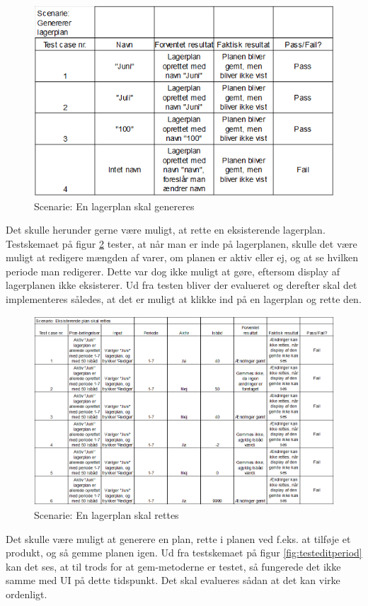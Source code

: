 \begin{figure}[p]
    \centering
    \includegraphics[width=0.7\hsize]{figures/tests/test_generer_plan.png}
    \caption{Scenarie: En lagerplan skal genereres}
    \label{fig:testgenerate}
\end{figure}

Det skulle herunder gerne være muligt, at rette en eksisterende lagerplan. Testskemaet på figur \ref{fig:testedit} tester, at når man er inde på lagerplanen, skulle det være muligt at redigere mængden af varer, om planen er aktiv eller ej, og at se hvilken periode man redigerer. Dette var dog ikke muligt at gøre, eftersom display af lagerplanen ikke eksisterer. Ud fra testen bliver der evalueret og derefter skal det implementeres således, at det er muligt at klikke ind på en lagerplan og rette den. 

\begin{figure}[p]
    \centering
    \includegraphics[width=0.7\hsize]{figures/tests/edit_existing_plan.png}
    \caption{Scenarie: En lagerplan skal rettes}
    \label{fig:testedit}
\end{figure}

Det skulle være muligt at generere en plan, rette i planen ved f.eks. at tilføje et produkt, og så gemme planen igen. Ud fra testskemaet på figur \ref{fig:testeditperiod} kan det ses, at til trods for at gem-metoderne er testet, så fungerede det ikke samme med UI på dette tidspunkt. Det skal evalueres sådan at det kan virke ordenligt.

